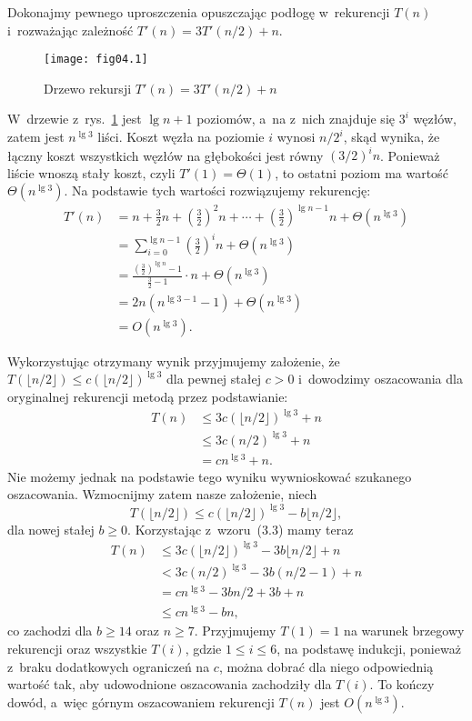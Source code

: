 
\exercise %
Dokonajmy pewnego uproszczenia opuszczając podłogę w~rekurencji $T(n)$ i~rozważając zależność $T'(n)=3T'(n/2)+n$.
\begin{figure}[ht]
	\begin{center}
		\texttt{[image: fig04.1]}
	\end{center}
	\caption{Drzewo rekursji $T'(n)=3T'(n/2)+n$} \label{fig:4.2-1}
\end{figure}
W~drzewie z~rys.~\ref{fig:4.2-1} jest $\lg n+1$ poziomów, a~na  z~nich znajduje się $3^i$ węzłów, zatem jest $n^{\lg3}$ liści. Koszt węzła na poziomie $i$ wynosi $n/2^i$, skąd wynika, że łączny koszt wszystkich węzłów na  głębokości jest równy $(3/2)^in$. Ponieważ liście wnoszą stały koszt, czyli $T'(1)=\Theta(1)$, to ostatni poziom ma wartość $\Theta(n^{\lg3})$. Na podstawie tych wartości rozwiązujemy rekurencję:
\begin{align*}
	T'(n) &= n+\frac{3}{2}n+\left(\frac{3}{2}\right)^2n+\cdots+\left(\frac{3}{2}\right)^{\lg n-1}n+\Theta(n^{\lg 3}) \\
	&= \sum_{i=0}^{\lg n-1}\left(\frac{3}{2}\right)^in+\Theta(n^{\lg 3}) \\
	&= \frac{\left(\frac{3}{2}\right)^{\lg n}-1}{\frac{3}{2}-1}\cdot n+\Theta(n^{\lg 3}) \\[1mm]
	&= 2n(n^{\lg 3-1}-1)+\Theta(n^{\lg 3}) \\
	&= O(n^{\lg 3}).
\end{align*}

Wykorzystując otrzymany wynik przyjmujemy założenie, że $T(\lfloor n/2\rfloor)\le c(\lfloor n/2\rfloor)^{\lg 3}$ dla pewnej stałej $c>0$ i~dowodzimy oszacowania dla oryginalnej rekurencji metodą przez podstawianie:
\begin{align*}
	T(n) &\le 3c(\lfloor n/2\rfloor)^{\lg 3}+n \\
	&\le 3c(n/2)^{\lg 3}+n \\
	&= cn^{\lg 3}+n.
\end{align*}
Nie możemy jednak na podstawie tego wyniku wywnioskować szukanego oszacowania. Wzmocnijmy zatem nasze założenie, niech
\[
	T(\lfloor n/2\rfloor) \le c(\lfloor n/2\rfloor)^{\lg 3}-b\lfloor n/2\rfloor,
\]
dla nowej stałej $b\ge0$. Korzystając z~wzoru~(3.3) mamy teraz
\begin{align*}
	T(n) &\le 3c(\lfloor n/2\rfloor)^{\lg 3}-3b\lfloor n/2\rfloor+n \\
	&< 3c(n/2)^{\lg 3}-3b(n/2-1)+n \\
	&= cn^{\lg 3}-3bn/2+3b+n \\
	&\le cn^{\lg 3}-bn,
\end{align*}
co zachodzi dla $b\ge14$ oraz $n\ge7$. Przyjmujemy $T(1)=1$ na warunek brzegowy rekurencji oraz wszystkie $T(i)$, gdzie $1\le i\le 6$, na podstawę indukcji, ponieważ z~braku dodatkowych ograniczeń na $c$, można dobrać dla niego odpowiednią wartość tak, aby udowodnione oszacowania zachodziły dla $T(i)$. To kończy dowód, a~więc górnym oszacowaniem rekurencji $T(n)$ jest $O(n^{\lg3})$.

